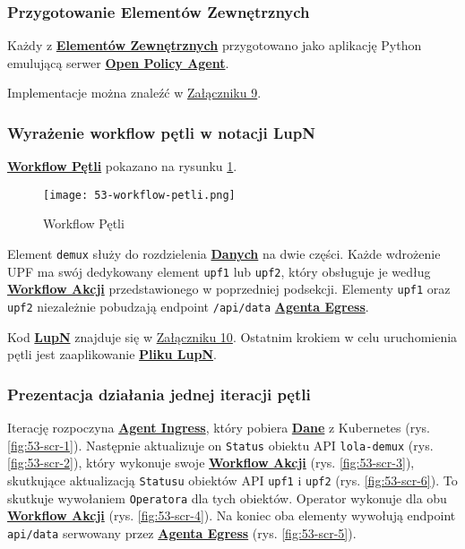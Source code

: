 \subsubsection{Przygotowanie Elementów Zewnętrznych}

Każdy z \hyperlink{def:element-zewnetrzny}{\textbf{Elementów Zewnętrznych}} przygotowano jako aplikację Python emulującą serwer \hyperlink{def:opa}{\textbf{Open Policy Agent}}.

Implementacje można znaleźć w \hyperlink{appendix:9}{Załączniku 9}.

\subsubsection{Wyrażenie workflow pętli w notacji LupN}

\hyperlink{def:workflow-petli}{\textbf{Workflow Pętli}} pokazano na rysunku \ref{fig:53-workflow-petli}.

\begin{figure}[!h]
    \centering \texttt{[image: 53-workflow-petli.png]}
    \caption{Workflow Pętli}\label{fig:53-workflow-petli}
\end{figure}

Element \texttt{demux} służy do rozdzielenia \hyperlink{def:dane}{\textbf{Danych}} na dwie części. Każde wdrożenie UPF ma swój dedykowany element \texttt{upf1} lub \texttt{upf2}, który obsługuje je według \hyperlink{def:workflow-petli}{\textbf{Workflow Akcji}} przedstawionego w poprzedniej podsekcji. Elementy \texttt{upf1} oraz \texttt{upf2} niezależnie pobudzają endpoint \texttt{/api/data} \hyperlink{def:agent-egress}{\textbf{Agenta Egress}}.

Kod \hyperlink{def:lupn}{\textbf{LupN}} znajduje się w \hyperlink{appendix:10}{Załączniku 10}. Ostatnim krokiem w celu uruchomienia pętli jest zaaplikowanie \hyperlink{def:plik-lupn}{\textbf{Pliku LupN}}.

\subsubsection{Prezentacja działania jednej iteracji pętli}

Iterację rozpoczyna \hyperlink{def:agent-ingress}{\textbf{Agent Ingress}}, który pobiera \hyperlink{def:dane}{\textbf{Dane}} z Kubernetes (rys. \ref{fig:53-scr-1}). Następnie aktualizuje on \texttt{Status} obiektu API \texttt{lola-demux} (rys. \ref{fig:53-scr-2}), który wykonuje swoje \hyperlink{def:workflow-petli}{\textbf{Workflow Akcji}} (rys. \ref{fig:53-scr-3}), skutkujące aktualizacją \texttt{Statusu} obiektów API \texttt{upf1} i \texttt{upf2} (rys. \ref{fig:53-scr-6}). To skutkuje wywołaniem \texttt{Operatora} dla tych obiektów. Operator wykonuje dla obu \hyperlink{def:workflow-petli}{\textbf{Workflow Akcji}} (rys. \ref{fig:53-scr-4}). Na koniec oba elementy wywołują endpoint \texttt{api/data} serwowany przez \hyperlink{def:agent-egress}{\textbf{Agenta Egress}} (rys. \ref{fig:53-scr-5}).


